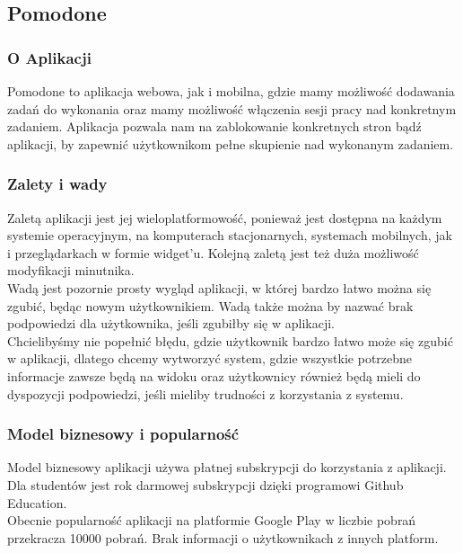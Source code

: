 \documentclass[a4paper,11pt]{report}
\begin{document}
\subsection{Pomodone}
\subsubsection{O Aplikacji}
Pomodone to aplikacja webowa, jak i mobilna, gdzie mamy możliwość dodawania zadań do wykonania
 oraz mamy możliwość włączenia sesji pracy nad konkretnym zadaniem.
 Aplikacja pozwala nam na zablokowanie konkretnych stron bądź aplikacji,
 by zapewnić użytkownikom pełne skupienie nad wykonanym zadaniem.
\subsubsection{Zalety i wady}
Zaletą aplikacji jest jej wieloplatformowość,
 ponieważ jest dostępna na każdym systemie operacyjnym, na komputerach stacjonarnych, systemach mobilnych,
 jak i przeglądarkach w formie widget'u.
 Kolejną zaletą jest też duża możliwość modyfikacji minutnika.
\vspace{0,5cm}
\\ Wadą jest pozornie prosty wygląd aplikacji, w której bardzo łatwo można się zgubić, będąc nowym użytkownikiem.
Wadą także można by nazwać brak podpowiedzi dla użytkownika, jeśli zgubiłby się w aplikacji.
\vspace{0,5cm}
\\Chcielibyśmy nie popełnić błędu, gdzie użytkownik bardzo łatwo może się zgubić w aplikacji,
 dlatego chcemy wytworzyć system, gdzie wszystkie potrzebne informacje zawsze będą na widoku
 oraz użytkownicy również będą mieli do dyspozycji podpowiedzi, jeśli mieliby trudności z korzystania z systemu.
\subsubsection{Model biznesowy i popularność}
Model biznesowy aplikacji używa płatnej subskrypcji do korzystania z aplikacji.
 Dla studentów jest rok darmowej subskrypcji dzięki programowi Github Education.
\vspace{0,5cm}\\
Obecnie popularność aplikacji na platformie Google Play w liczbie pobrań przekracza 10000 pobrań.
 Brak informacji o użytkownikach z innych platform.
\end{document}

